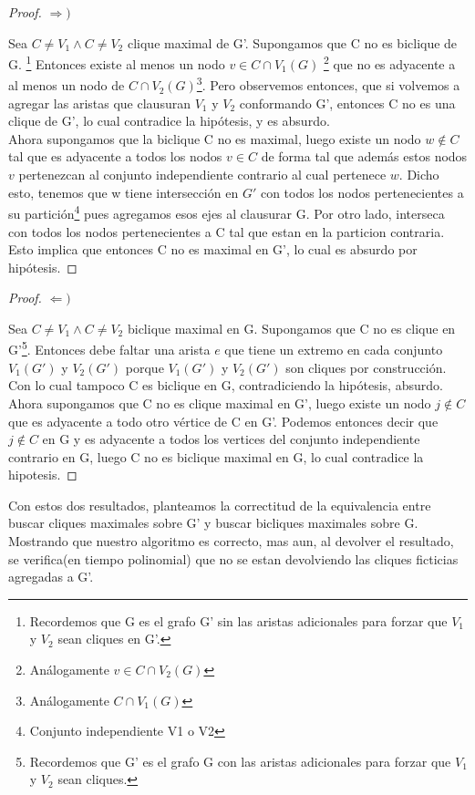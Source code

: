 \documentclass[10pt,a4paper]{article}
\begin{document}
\begin{proof}
$\Rightarrow)$

Sea $ C \neq V_1 \land C \neq V_2 $ clique maximal de G'. Supongamos que C no es biclique de G. \footnote{Recordemos que G es el grafo G' sin las aristas adicionales para forzar que $V_1$ y $V_2$ sean cliques en G'.} Entonces existe al menos un nodo $v \in C \cap V_1(G)$ \footnote{An\'alogamente $v \in C \cap V_2(G)$} que no es adyacente a al menos un nodo de $C \cap V_2(G)$\footnote{An\'alogamente $C \cap V_1(G)$}. Pero observemos entonces, que si volvemos a agregar las aristas que clausuran $V_1$ y $V_2$ conformando G', entonces C no es una clique de G', lo cual contradice la hip\'otesis, y es absurdo.\\

Ahora supongamos que la biclique C no es maximal, luego existe un nodo $w \notin C$ tal que es adyacente a todos los nodos $v \in C$ de forma tal que adem\'as estos nodos $v$ pertenezcan al conjunto independiente contrario al cual pertenece $w$. Dicho esto, tenemos que w tiene intersección en $G'$ con todos los nodos pertenecientes a su partición\footnote{Conjunto independiente V1 o V2} pues agregamos esos ejes al clausurar G. Por otro lado, interseca con todos los nodos pertenecientes a C tal que estan en la particion contraria. Esto implica que entonces C no es maximal en G', lo cual es absurdo por hipótesis. 
\end{proof}

\begin{proof}
$\Leftarrow)$

Sea $ C \neq V_1 \land C \neq V_2 $ biclique maximal en G. Supongamos que C no es clique en G'\footnote{Recordemos que G' es el grafo G con las aristas adicionales para forzar que $V_1$ y $V_2$ sean cliques.}. Entonces debe faltar una arista $e$ que tiene un extremo en cada conjunto $V_1(G')$ y $V_2(G')$ porque $V_1(G')$ y $V_2(G')$ son cliques por construcci\'on. Con lo cual tampoco C es biclique en G, contradiciendo la hip\'otesis, absurdo.\\

Ahora supongamos que C no es clique maximal en G', luego existe un nodo $j \notin C$ que es adyacente a todo otro vértice de C en G'. Podemos entonces decir que $j \notin C$ en G y es adyacente a todos los vertices del conjunto independiente contrario en G, luego C no es biclique maximal en G, lo cual contradice la hipotesis.  
\end{proof}

Con estos dos resultados, planteamos la correctitud de la equivalencia entre buscar cliques maximales sobre G' y buscar bicliques maximales sobre G. Mostrando que nuestro algoritmo es correcto, mas aun, al devolver el resultado, se verifica(en tiempo polinomial) que no se estan devolviendo las cliques ficticias agregadas a G'.
\end{document}
